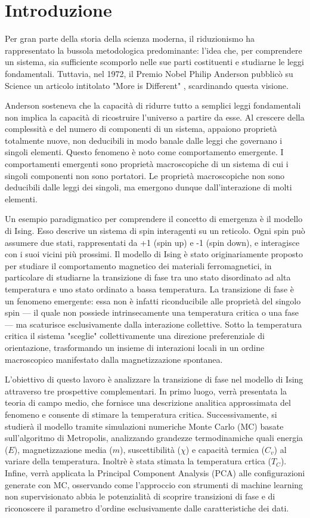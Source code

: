 \section{Introduzione}
Per gran parte della storia della scienza moderna, il riduzionismo ha rappresentato la bussola metodologica predominante: 
l'idea che, per comprendere un sistema, sia sufficiente scomporlo nelle sue parti costituenti e studiarne le leggi fondamentali. Tuttavia,
nel 1972, il Premio Nobel Philip Anderson pubblicò su Science un articolo intitolato "More is Different" \cite{anderson}, 
scardinando questa visione.

Anderson sosteneva che la capacità di ridurre tutto a semplici leggi fondamentali non implica 
la capacità di ricostruire l'universo a partire da esse. Al crescere della complessità e del numero 
di componenti di un sistema, appaiono proprietà totalmente nuove, non deducibili in modo banale dalle 
leggi che governano i singoli elementi. Questo fenomeno è noto come comportamento emergente. I comportamenti emergenti sono proprietà macroscopiche 
di un sistema di cui i singoli componenti non sono portatori. Le proprietà macroscopiche 
non sono deducibili dalle leggi dei singoli, ma emergono dunque dall'interazione di molti elementi.

Un esempio paradigmatico per comprendere il concetto di emergenza è il modello di Ising. Esso descrive un sistema di spin interagenti su 
un reticolo. Ogni spin può assumere due stati, rappresentati da +1 (spin up) e -1 (spin down), e interagisce con i suoi vicini più prossimi.
Il modello di Ising è stato originariamente proposto per studiare il comportamento magnetico dei materiali ferromagnetici, in particolare di studiarne la transizione 
di fase tra uno stato disordinato ad alta temperatura e uno stato ordinato a bassa temperatura. La transizione di fase è un fenomeno emergente: essa non è infatti riconducibile alle proprietà del singolo spin —
il quale non possiede intrinsecamente una temperatura critica o una fase —
ma scaturisce esclusivamente dalla interazione collettive. Sotto la temperatura critica il sistema "sceglie" collettivamente 
una direzione preferenziale di orientazione, trasformando un insieme di interazioni 
locali in un ordine macroscopico manifestato dalla magnetizzazione spontanea.

L’obiettivo di questo lavoro è analizzare la transizione di fase nel modello di Ising attraverso tre prospettive complementari. In primo luogo,
verrà presentata la teoria di campo medio, che fornisce una descrizione analitica approssimata del fenomeno e consente di stimare la temperatura critica.
Successivamente, si studierà il modello tramite simulazioni numeriche Monte Carlo (MC) basate sull’algoritmo di Metropolis,
analizzando grandezze termodinamiche quali energia ($E$), magnetizzazione media ($m$), suscettibilità ($\chi$) e capacità termica ($C_v$)
al variare della temperatura. Inoltrè è stata stimata la temperatura crtica ($T_C$).
Infine, verrà applicata la Principal Component Analysis (PCA) alle configurazioni generate con MC, 
osservando come l'approccio con strumenti di machine learning non supervisionato 
abbia le potenzialità di scoprire transizioni di fase e di riconoscere il parametro d'ordine esclusivamente dalle caratteristiche dei dati.